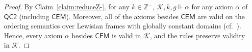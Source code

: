 \documentclass[12pt]{article}
\newcommand{\would}{\mathbin{>}}
\newcommand{\then}{\mathbin{\supset}}
\begin{document}
\begin{proof}
By Claim~\ref{claim:reduceZ-}, for any $k \in \mathbb{Z}^-$, $\mathcal{K},k,g\Vdash\alpha$ for any axiom $\alpha$ of $\mathsf{QC2}$ (including $\mathsf{CEM}$). %
Moreover, all of the axioms besides $\mathsf{CEM}$ are valid on the ordering semantics over Lewisian frames with globally constant domains (cf.~\cite{Lewis1971}). 
Hence, every axiom $\alpha$ besides $\mathsf{CEM}$ is valid in $\mathcal{K}$, and the rules preserve validity in $\mathcal{K}$. %



\end{proof}
\end{document}
